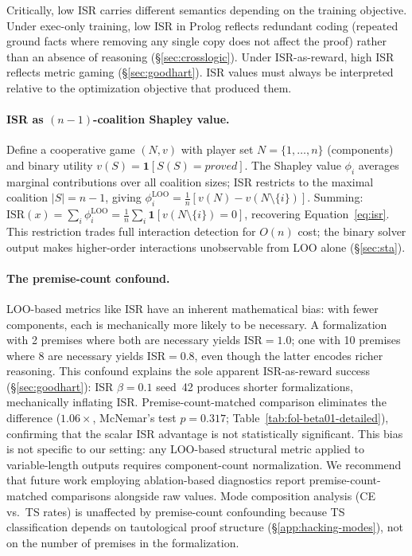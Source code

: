 Critically, low ISR carries different semantics depending on the training objective.
Under exec-only training, low ISR in Prolog reflects redundant coding (repeated ground facts where removing any single copy does not affect the proof) rather than an absence of reasoning (\S\ref{sec:crosslogic}).
Under ISR-as-reward, high ISR reflects metric gaming (\S\ref{sec:goodhart}).
ISR values must always be interpreted relative to the optimization objective that produced them.

\paragraph{ISR as $(n{-}1)$-coalition Shapley value.}
\label{app:shapley}
Define a cooperative game $(N, v)$ with player set $N = \{1,\ldots,n\}$ (components) and binary utility $v(S) = \mathbf{1}[S(S){=}\textit{proved}]$.
The Shapley value $\phi_i$ averages marginal contributions over all coalition sizes; ISR restricts to the maximal coalition $|S|{=}n{-}1$, giving $\phi_i^{\text{LOO}} = \frac{1}{n}[v(N) - v(N \setminus \{i\})]$.
Summing: $\text{ISR}(x) = \sum_i \phi_i^{\text{LOO}} = \frac{1}{n}\sum_i \mathbf{1}[v(N \setminus \{i\}){=}0]$, recovering Equation~\ref{eq:isr}.
This restriction trades full interaction detection for $O(n)$ cost; the binary solver output makes higher-order interactions unobservable from LOO alone (\S\ref{sec:sta}).

\paragraph{The premise-count confound.}
\label{app:premise-count}
LOO-based metrics like ISR have an inherent mathematical bias: with fewer components, each is mechanically more likely to be necessary.
A formalization with 2 premises where both are necessary yields ISR${=}1.0$; one with 10 premises where 8 are necessary yields ISR${=}0.8$, even though the latter encodes richer reasoning.
This confound explains the sole apparent ISR-as-reward success (\S\ref{sec:goodhart}): ISR $\beta{=}0.1$ seed~42 produces shorter formalizations, mechanically inflating ISR.
Premise-count-matched comparison eliminates the difference ($1.06\times$, McNemar's test $p{=}0.317$; Table~\ref{tab:fol-beta01-detailed}), confirming that the scalar ISR advantage is not statistically significant.
This bias is not specific to our setting: any LOO-based structural metric applied to variable-length outputs requires component-count normalization.
We recommend that future work employing ablation-based diagnostics report premise-count-matched comparisons alongside raw values.
Mode composition analysis (CE vs.\ TS rates) is unaffected by premise-count confounding because TS classification depends on tautological proof structure (\S\ref{app:hacking-modes}), not on the number of premises in the formalization.


